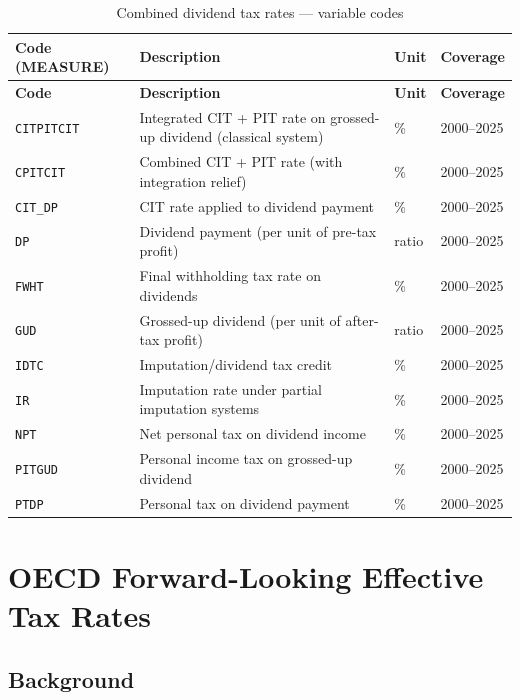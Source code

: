 \documentclass[11pt,a4paper]{article}
\begin{document}
\begin{longtable}{L{2.8cm} L{6.5cm} C{1.8cm} C{2.5cm}}
    \caption{Combined dividend tax rates --- variable codes}
    \label{tab:div_rates}\\
    \toprule
    \textbf{Code (MEASURE)} & \textbf{Description} & \textbf{Unit} & \textbf{Coverage} \\
    \midrule
    \endfirsthead
    \toprule
    \textbf{Code} & \textbf{Description} & \textbf{Unit} & \textbf{Coverage} \\
    \midrule
    \endhead
    \bottomrule
    \endlastfoot
    \texttt{CITPITCIT}  & Integrated CIT + PIT rate on grossed-up dividend (classical system) & \% & 2000--2025 \\
    \texttt{CPITCIT}    & Combined CIT + PIT rate (with integration relief) & \% & 2000--2025 \\
    \texttt{CIT\_DP}    & CIT rate applied to dividend payment & \% & 2000--2025 \\
    \texttt{DP}         & Dividend payment (per unit of pre-tax profit) & ratio & 2000--2025 \\
    \texttt{FWHT}       & Final withholding tax rate on dividends & \% & 2000--2025 \\
    \texttt{GUD}        & Grossed-up dividend (per unit of after-tax profit) & ratio & 2000--2025 \\
    \texttt{IDTC}       & Imputation/dividend tax credit & \% & 2000--2025 \\
    \texttt{IR}         & Imputation rate under partial imputation systems & \% & 2000--2025 \\
    \texttt{NPT}        & Net personal tax on dividend income & \% & 2000--2025 \\
    \texttt{PITGUD}     & Personal income tax on grossed-up dividend & \% & 2000--2025 \\
    \texttt{PTDP}       & Personal tax on dividend payment & \% & 2000--2025 \\
\end{longtable}


\section{OECD Forward-Looking Effective Tax Rates}
\label{sec:etr}

\subsection{Background}
\label{subsec:etr_background}
\end{document}
